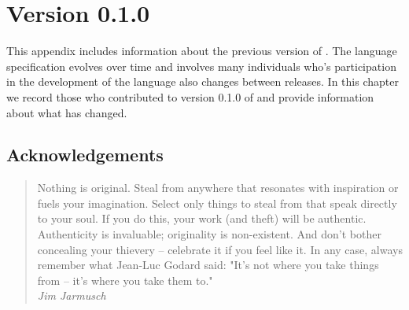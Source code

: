 \chapter{\pharmml Version 0.1.0}

This appendix includes information about the previous version of \pharmml. The language specification evolves over time and involves many individuals who's participation in the development of the language also changes between releases. In this chapter we record those who contributed to version 0.1.0 of \pharmml and provide information about what has changed.

\section{Acknowledgements}
\label{chap:acknow-v0_1}

 \begin{quote}
{\small
Nothing is original. Steal from anywhere that resonates with inspiration or fuels your imagination. Select only things to steal from that speak directly to your soul. If you do this, your work (and theft) will be authentic. Authenticity is invaluable; originality is non-existent. And don't bother concealing your thievery -- celebrate it if you feel like it. In any case, always remember what Jean-Luc Godard said: "It's not where you take things from -- it's where you take them to." \\
\textit{Jim Jarmusch}}
\end{quote}

